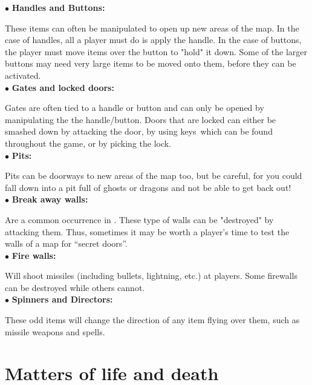 $\bullet$ {\bf Handles and Buttons:}

These items can often be manipulated to open up new areas of the map.
In the case of handles, all a player must do is apply the handle. In
the case of buttons, the player must move items over the button to
"hold" it down. Some of the larger buttons may need very large items to
be moved onto them, before they can be activated. \\

$\bullet$ {\bf Gates and locked doors:} 

Gates are often tied to a handle or button and can only be opened by
manipulating the the handle/button. Doors that are locked can either be
smashed down by attacking the door, by using keys\
which can be found
throughout the game, or by picking the lock. \\

$\bullet$ {\bf Pits:}

Pits can be doorways to new areas of the map too, but be careful, for
you could fall down into a pit full of ghosts or dragons and not be
able to get back out! \\

$\bullet$ {\bf Break away walls:}

Are a common occurrence in \cf . These type of walls can be
"destroyed" by attacking them. Thus, sometimes it may be worth a
player's time to test the walls of a map for ``secret doors''. \\

$\bullet$ {\bf Fire walls:} 

Will shoot missiles (including bullets, lightning, etc.) at players.
Some firewalls can be destroyed while others cannot. \\

$\bullet$ {\bf Spinners and Directors:} 

These odd items will change the direction of any item flying over them,
such as missile weapons and spells. \\


\section{Matters of life and death}

